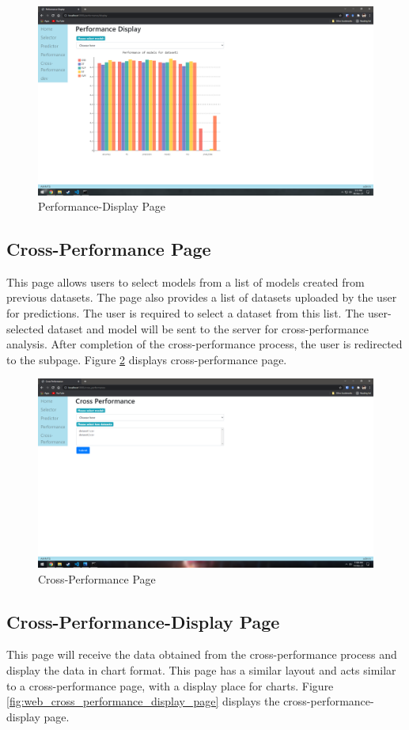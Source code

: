 \begin{figure}[H]
  \centering
  \includegraphics[width=0.7\columnwidth]{media/website/pages/04_performance_display.png}
  \caption{Performance-Display Page}
  \label{fig:web_performance_display_page}
\end{figure}

\subsection{Cross-Performance Page} \label{subsec:cross_performance_page}
This page allows users to select models from a list of models created from previous datasets. The page also provides a list of datasets uploaded by the user for predictions. The user is required to select a dataset from this list. The user-selected dataset and model will be sent to the server for cross-performance analysis. After completion of the cross-performance process, the user is redirected to the subpage. Figure \ref{fig:web_cross_performance_page} displays cross-performance page.

\begin{figure}[H]
  \centering
  \includegraphics[width=0.7\columnwidth]{media/website/pages/05_cross_performance.png}
  \caption{Cross-Performance Page}
  \label{fig:web_cross_performance_page}
\end{figure}

\subsection{Cross-Performance-Display Page} \label{subsec:cross_performance_display Page} This page will receive the data obtained from the cross-performance process and display the data in chart format. This page has a similar layout and acts similar to a cross-performance page, with a display place for charts. Figure \ref{fig:web_cross_performance_display_page} displays the cross-performance-display page.

